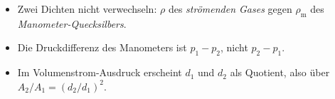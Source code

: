 \begin{achtung}
\begin{itemize}
  \item Zwei Dichten nicht verwechseln: $\rho$ des \emph{strömenden Gases} gegen
       $\rho_\mathrm{m}$ des \emph{Manometer-Quecksilbers}.
  \item Die Druckdifferenz des Manometers ist $p_1-p_2$, nicht $p_2-p_1$.
  \item Im Volumenstrom-Ausdruck erscheint $d_1$ und $d_2$ als Quotient,
       also über $A_2/A_1=(d_2/d_1)^2$.
\end{itemize}
\end{achtung}
